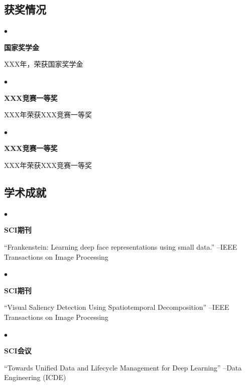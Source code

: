 \documentclass[CJKutf8]{tccv}
\begin{document}
\begin{CJK*}{UTF8}{gbsn}
  \rule{0pt}{0.5ex}
  \begin{CJK*}{UTF8}{gkai}
    \section{\LARGE \textbf{获奖情况}}
  \end{CJK*}
  \begin{factlist}
  \item{$\bullet$}
    {\textbf{国家奖学金}\\
      \RaggedRight \begin{CJK*}{UTF8}{gkai}
        XXX年，荣获国家奖学金
        \end{CJK*}}
   \item{$\bullet$}
    {\textbf{XXX竞赛一等奖}\\
      \RaggedRight \begin{CJK*}{UTF8}{gkai}
        XXX年荣获XXX竞赛一等奖
        \end{CJK*}}
        \item{$\bullet$}
    {\textbf{XXX竞赛一等奖}\\
      \RaggedRight \begin{CJK*}{UTF8}{gkai}
        XXX年荣获XXX竞赛一等奖
        \end{CJK*}}
  \end{factlist}

  \rule{0pt}{0.5ex}
  \begin{CJK*}{UTF8}{gkai}
    \section{\LARGE \textbf{学术成就}}
  \end{CJK*}
  \begin{factlist}
  \item{$\bullet$}
    {\textbf{SCI期刊}\\
      \RaggedRight \begin{CJK*}{UTF8}{gkai}
       “Frankenstein: Learning deep face representations using small data.” --IEEE Transactions on Image Processing 
        \end{CJK*}}
   \item{$\bullet$}
    {\textbf{SCI期刊}\\
      \RaggedRight \begin{CJK*}{UTF8}{gkai}
        “Visual Saliency Detection Using Spatiotemporal Decomposition” --IEEE Transactions on Image Processing 
        \end{CJK*}}
        
   \item{$\bullet$}
    {\textbf{SCI会议}\\
      \RaggedRight \begin{CJK*}{UTF8}{gkai}
        “Towards Unified Data and Lifecycle Management for Deep Learning” --Data Engineering (ICDE)
        \end{CJK*}}
  \end{factlist}
\end{CJK*}
\end{document}
